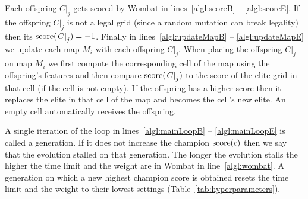 Each offspring $\left.C\right|_j$ gets scored by {\sc Wombat} in lines~\ref{algl:scoreB} -- \ref{algl:scoreE}. If the offspring $\left.C\right|_j$ is not a legal grid (since a random mutation can break legality) then its $\operatorname{score}(\left.C\right|_j) = -1$. Finally in lines~\ref{algl:updateMapB} -- \ref{algl:updateMapE} we update each map $M_i$ with each offspring $\left.C\right|_j$. When placing the offspring $\left.C\right|_j$ on map $M_i$ we first compute the corresponding cell of the map using the offspring's features and then compare $\operatorname{score}(\left.C\right|_j)$ to the score of the elite grid in that cell (if the cell is not empty). If the offspring has a higher score then it replaces the elite in that cell of the map and becomes the cell's new elite. An empty cell automatically receives the offspring.

A single iteration of the loop in lines~\ref{algl:mainLoopB} -- \ref{algl:mainLoopE} is called a generation. If it does not increase the champion $\operatorname{score}(c)$ then we say that the evolution stalled on that generation. The longer the evolution stalls the higher the time limit and the weight are in {\sc Wombat} in line~\ref{algl:wombat}. A generation on which a new highest champion score is obtained resets the time limit and the weight to their lowest settings (Table~\ref{tab:hyperparameters}).

